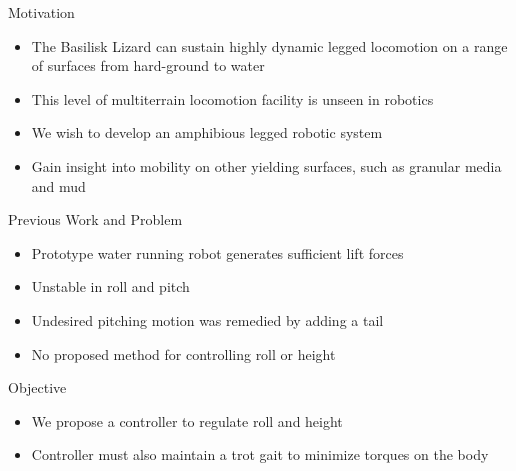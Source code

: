 \textcolor{prime}{\textsf{Motivation}}
\begin{itemize}
	\item The Basilisk Lizard can sustain highly dynamic legged locomotion on a range of surfaces from hard-ground to water~\cite{glasheen1996hydrodynamic}
	\item This level of multiterrain locomotion facility is unseen in robotics
    \item We wish to develop an amphibious legged robotic system
    \item Gain insight into mobility on other yielding surfaces, such as granular media and mud
\end{itemize} 
\vspace{2EX}

\textcolor{prime}{\textsf{Previous Work and Problem}}
\begin{itemize}
    \item Prototype water running robot generates sufficient lift forces
    \item Unstable in roll and pitch
    \item Undesired pitching motion was remedied by adding a tail~\cite{park2010roll}
    \item No proposed method for controlling roll or height
\end{itemize}
\vspace{2EX}

\textcolor{prime}{\textsf{Objective}}
\begin{itemize}
	\item We propose a controller to regulate roll and height 
	\item Controller must also maintain a trot gait to minimize torques on the body
\end{itemize}
